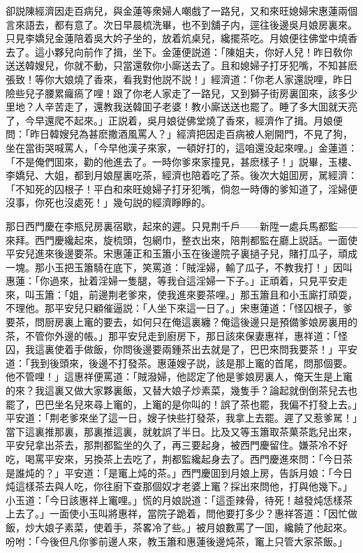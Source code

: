 卻説陳經濟因走百病兒，與金蓮等衆婦人嘲戲了一路兒，又和來旺媳婦宋惠蓮兩個言來語去，都有意了。次日早晨梳洗畢，也不到舖子内，逕往後邊吳月娘房裏來。只見李嬌兒金蓮陪着吳大妗子坐的，放着炕桌兒，纔擺茶吃。月娘便往佛堂中燒香去了。這小夥兒向前作了揖，坐下。金蓮便説道：「陳姐夫，你好人兒！昨日敎你送送韓嫂兒，你就不動，只當還敎你小廝送去了。且和媳婦子打牙犯嘴，不知甚麽張致！等你大娘燒了香來，看我對他説不説！」經濟道：「你老人家還説哩，昨日險些兒子腰累㿚瘑了哩！跟了你老人家走了一路兒，又到獅子街房裏囬來，該多少里地？人辛苦走了，還教我送韓囬子老婆！教小廝送送也罷了。睡了多大囬就天亮了，今早還爬不起來。」正説着，吳月娘従佛堂燒了香來，經濟作了揖。月娘便問：「昨日韓嫂兒為甚麽撒酒風罵人？」經濟把因走百病被人剜開門，不見了狗，坐在當街哭喊罵人，「今早他漢子來家，一頓好打的，這咱還没起來哩。」金蓮道：「不是俺們囬來，勸的他進去了。一時你爹來家撞見，甚麽樣子！」説畢，玉樓、李嬌兒、大姐，都到月娘屋裏吃茶，經濟也陪着吃了茶。後次大姐囬房，駡經濟：「不知死的囚根子！平白和來旺媳婦子打牙犯嘴，倘忽一時傳的爹知道了，淫婦便沒事，你死也沒處死！」幾句説的經濟睜睜的。

那日西門慶在李瓶兒房裏宿歇，起來的遲。只見荆千戶——新陞一處兵馬都監——來拜。西門慶纔起來，旋梳頭，包網巾，整衣出來，陪荆都監在廳上説話。一面使平安兒進來後邊要茶。宋惠蓮正和玉簫小玉在後邊院子裏撾子兒，賭打瓜子，頑成一塊。那小玉把玉簫騎在底下，笑罵道：「賊淫婦，輸了瓜子，不教我打！」因叫惠蓮：「你過來，扯着淫婦一隻腿，等我㒲這淫婦一下子。」正頑着，只見平安走來，叫玉簫：「姐，前邊荆老爹來，使我進來要茶哩。」那玉簫且和小玉廝打頑耍，不理他。那平安兒只顧催逼説：「人坐下來這一日了。」宋惠蓮道：「怪囚根子，爹要茶，問厨房裏上竃的要去，如何只在俺這裏纏？俺這後邊只是預備爹娘房裏用的茶，不管你外邊的帳。」那平安兒走到廚房下，那日該來保妻惠祥，惠祥道：「怪囚，我這裏使着手做飯，你問後邊要兩鍾茶出去就是了，巴巴來問我要茶！」平安道：「我到後頭來，後邊不打發茶。惠蓮嫂子説，該是那上竃的首尾，問那個要。他不管哩！」這惠祥便罵道：「賊潑婦，他認定了他是爹娘房裏人，俺天生是上竃的來？我這裏又做大家夥裏飯，又替大娘子炒素菜，幾隻手？論起就倒倒茶兒去也罷了，巴巴坐名兒來尋上竃的，上竃的是你叫的！誤了茶也罷，我偏不打發上去。」平安道：「荆老爹來坐了這一日，嫂子快些打發茶，我拿上去罷。遲了又惹爹駡！」當下這裏推那裏，那裏推這裏，就躭誤了半日。比及又等玉簫取茶菓茶匙兒出來，平安兒拿出茶去，那荆都監坐的久了，再三要起身，被西門慶留住。嫌茶冷不好吃，喝罵平安來，另換茶上去吃了，荆都監纔起身去了。西門慶進來問：「今日茶是誰炖的？」平安道：「是竃上炖的茶。」西門慶囬到月娘上房，告訴月娘：「今日炖這樣茶去與人吃，你往廚下查那個奴才老婆上竃？採出來問他，打與他幾下。」小玉道：「今日該惠祥上竃哩。」慌的月娘説道：「這歪辣骨，待死！越發炖恁樣茶上去了。」一面使小玉叫將惠祥，當院子跪着，問他要打多少？惠祥答道：「因忙做飯，炒大娘子素菜，使着手，茶畧冷了些。」被月娘數罵了一囬，纔饒了他起來。吩咐：「今後但凡你爹前邊人來，教玉簫和惠蓮後邊炖茶，竃上只管大家茶飯。」

